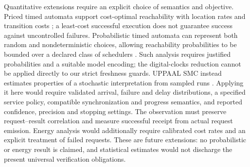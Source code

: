 
Quantitative extensions require an explicit choice of semantics and objective.
Priced timed automata support cost-optimal reachability with location rates and
transition costs \cite{behrmann_priced_2001}; a least-cost successful execution
does not guarantee success against uncontrolled failures. Probabilistic timed
automata can represent both random and nondeterministic choices, allowing
reachability probabilities to be bounded over a declared class of schedulers
\cite{kwiatkowska_digital_clocks_2006}. Such analysis requires justified
probabilities and a suitable model encoding; the digital-clocks reduction cannot
be applied directly to our strict freshness guards. UPPAAL SMC instead estimates
properties of a stochastic interpretation from sampled runs
\cite{uppaal_smc_2015}. Applying it here would require validated arrival, failure
and delay distributions, a specified service policy, compatible synchronization
and progress semantics, and reported confidence, precision and stopping settings.
The observation must preserve request--result correlation and measure successful
receipt from actual request emission. Energy analysis would additionally require
calibrated cost rates and an explicit treatment of failed requests. These are
future extensions: no probabilistic or energy result is claimed, and statistical
estimates would not discharge the present universal verification obligations.
